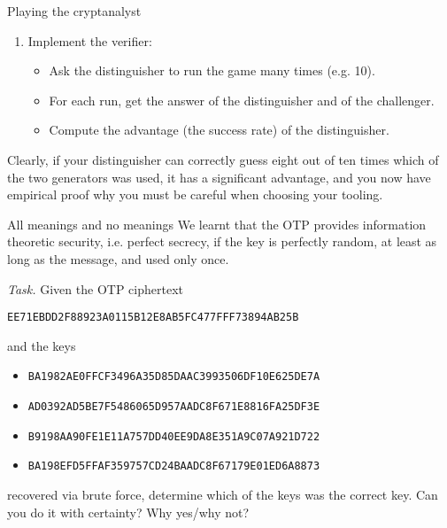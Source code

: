 \documentclass{practice}
\begin{document}
\begin{task}{Playing the cryptanalyst}
\begin{enumerate}
    \item Implement the verifier:
    \begin{itemize}
      \item Ask the distinguisher to run the game many times (e.g. 10).
      \item For each run, get the answer of the distinguisher and of the challenger.
      \item Compute the advantage (the success rate) of the distinguisher.
    \end{itemize}
  \end{enumerate}

  Clearly, if your distinguisher can correctly guess eight out of ten times which of the two generators was used, it has a significant advantage, and you now have empirical proof why you must be careful when choosing your tooling.
\end{task}

\begin{task}{All meanings and no meanings}
  We learnt that the OTP provides information theoretic security, i.e. perfect secrecy, if the key is perfectly random, at least as long as the message, and used only once.

  \textit{Task.}
  Given the OTP ciphertext
  \begin{center}
    \texttt{EE71EBDD2F88923A0115B12E8AB5FC477FFF73894AB25B}
  \end{center}
  and the keys
  \begin{itemize}
    \item \texttt{BA1982AE0FFCF3496A35D85DAAC3993506DF10E625DE7A}
    \item \texttt{AD0392AD5BE7F5486065D957AADC8F671E8816FA25DF3E}
    \item \texttt{B9198AA90FE1E11A757DD40EE9DA8E351A9C07A921D722}
    \item \texttt{BA198EFD5FFAF359757CD24BAADC8F67179E01ED6A8873}
  \end{itemize}
  recovered via brute force, determine which of the keys was the correct key.
  Can you do it with certainty?
  Why yes/why not?
\end{task}
\end{document}
